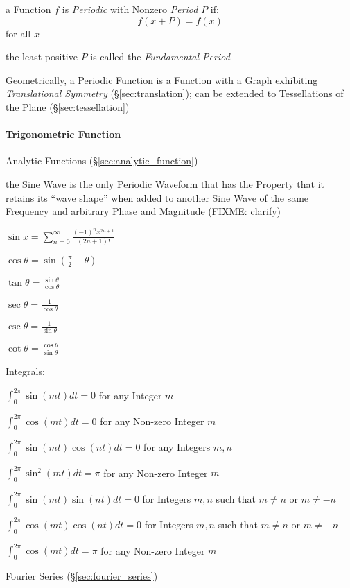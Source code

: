 a Function $f$ is \emph{Periodic} with Nonzero \emph{Period} $P$ if:
\[
  f(x+P) = f(x)
\]
for all $x$

the least positive $P$ is called the \emph{Fundamental Period}

Geometrically, a Periodic Function is a Function with a Graph exhibiting
\emph{Translational Symmetry} (\S\ref{sec:translation});
can be extended to Tessellations of the Plane (\S\ref{sec:tessellation})



\paragraph{Trigonometric Function}\label{sec:trigonometric_function}\hfill

Analytic Functions (\S\ref{sec:analytic_function})

the Sine Wave is the only Periodic Waveform that has the Property that it
retains its ``wave shape'' when added to another Sine Wave of the same
Frequency and arbitrary Phase and Magnitude (FIXME: clarify)

$\sin x = \sum_{n=0}^\infty \frac{(-1)^n x^{2n+1}}{(2n + 1)!}$

$\cos\theta= \sin(\frac{\pi}{2} - \theta)$

$\tan\theta = \frac{\sin\theta}{\cos\theta}$

$\sec\theta = \frac{1}{\cos\theta}$

$\csc\theta = \frac{1}{\sin\theta}$

$\cot\theta = \frac{\cos\theta}{\sin\theta}$

Integrals:

$\int_0^{2\pi} \sin(mt)dt = 0$ for any Integer $m$

$\int_0^{2\pi} \cos(mt)dt = 0$ for any Non-zero Integer $m$

$\int_0^{2\pi} \sin(mt)\cos(nt)dt = 0$ for any Integers $m,n$

$\int_0^{2\pi} \sin^2(mt)dt = \pi$ for any Non-zero Integer $m$

$\int_0^{2\pi} \sin(mt)\sin(nt)dt = 0$ for Integers $m,n$ such that $m\neq{n}$
or $m\neq{-n}$

$\int_0^{2\pi} \cos(mt)\cos(nt)dt = 0$ for Integers $m,n$ such that $m\neq{n}$
or $m\neq{-n}$

$\int_0^{2\pi} \cos(mt)dt = \pi$ for any Non-zero Integer $m$

\fist Fourier Series (\S\ref{sec:fourier_series})



